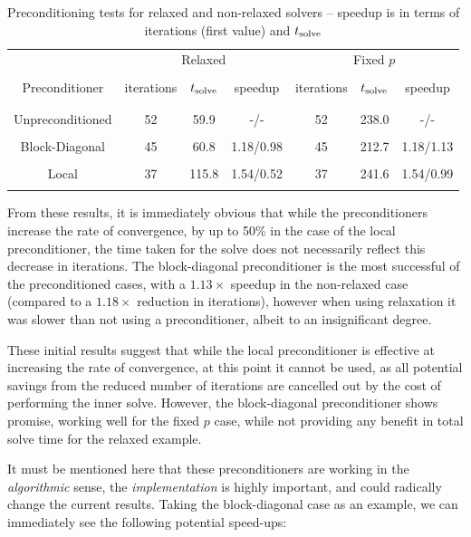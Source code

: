 \begin{table}[htdp]
\begin{center}
\begin{tabular}{c|c|c|c|c|c|c}

 & \multicolumn{3}{c|}{Relaxed} & \multicolumn{3}{c}{Fixed $p$} \\
 & \multicolumn{3}{c|}{} & \multicolumn{3}{c}{} \\
 Preconditioner & iterations & $t_{\text{solve}}$ & speedup & iterations & $t_{\text{solve}}$ & speedup\\
 & & & & & & \\ \hline
  & & & & & &  \\
 Unpreconditioned & 52 & 59.9 & -/- & 52 & 238.0 & -/- \\
 & & & & & & \\
 Block-Diagonal & 45 & 60.8 & 1.18/0.98 & 45 & 212.7 & 1.18/1.13\\
  & & & & & & \\ 
 Local & 37 & 115.8 & 1.54/0.52 & 37 & 241.6 & 1.54/0.99\\
 & & & & & & 
\end{tabular}
\end{center}
\caption{Preconditioning tests for relaxed and non-relaxed solvers -- speedup is in terms of iterations (first value) and $t_{\text{solve}}$}
\label{tab:relaxation_preconditioning}
\end{table}%

From these results, it is immediately obvious that while the preconditioners increase the rate of convergence, by up to 50\% in the case of the local preconditioner, the time taken for the solve  does not necessarily reflect this decrease in iterations. The block-diagonal preconditioner is the most successful of the preconditioned cases, with a $1.13\times$ speedup in the non-relaxed case (compared to a $1.18\times$ reduction in iterations), however when using relaxation it was slower than not using a preconditioner, albeit to an insignificant degree.

These initial results suggest that while the local preconditioner is effective at increasing the rate of convergence, at this point it cannot be used, as all potential savings from the reduced number of iterations are cancelled out by the cost of performing the inner {\gmres} solve. However, the block-diagonal preconditioner shows promise, working well for the fixed $p$ case, while not providing any benefit in total solve time for the relaxed example.

It must be mentioned here that these preconditioners are working in the \emph{algorithmic} sense, the \emph{implementation} is highly important, and could radically change the current results. Taking the block-diagonal case as an example, we can immediately see the following potential speed-ups:

